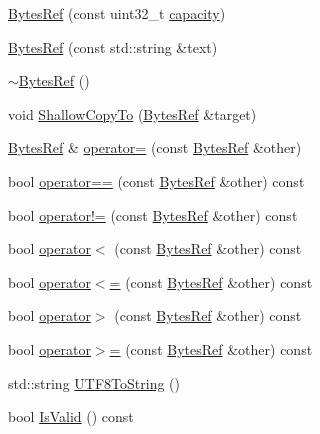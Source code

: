 \begin{DoxyCompactItemize}
\item 
\mbox{\hyperlink{classlucene_1_1core_1_1util_1_1BytesRef_add244078b49f9f132839a804f1312223}{Bytes\+Ref}} (const uint32\+\_\+t \mbox{\hyperlink{classlucene_1_1core_1_1util_1_1BytesRef_a9e1775d26ac1dec137aa57fae87f654c}{capacity}})
\item 
\mbox{\hyperlink{classlucene_1_1core_1_1util_1_1BytesRef_a27fd90759a52d4ea1fe88e5af2f7bb92}{Bytes\+Ref}} (const std\+::string \&text)
\item 
\mbox{\hyperlink{classlucene_1_1core_1_1util_1_1BytesRef_a7c9d7930ac1511839e4cd2f551e8a78a}{$\sim$\+Bytes\+Ref}} ()
\item 
void \mbox{\hyperlink{classlucene_1_1core_1_1util_1_1BytesRef_a2f75314d896984075dfd351b4d8e3e49}{Shallow\+Copy\+To}} (\mbox{\hyperlink{classlucene_1_1core_1_1util_1_1BytesRef}{Bytes\+Ref}} \&target)
\item 
\mbox{\hyperlink{classlucene_1_1core_1_1util_1_1BytesRef}{Bytes\+Ref}} \& \mbox{\hyperlink{classlucene_1_1core_1_1util_1_1BytesRef_a83163bf442814183adc151dccf70bc73}{operator=}} (const \mbox{\hyperlink{classlucene_1_1core_1_1util_1_1BytesRef}{Bytes\+Ref}} \&other)
\item 
bool \mbox{\hyperlink{classlucene_1_1core_1_1util_1_1BytesRef_a1f856405da2816cb3bf448507e296d97}{operator==}} (const \mbox{\hyperlink{classlucene_1_1core_1_1util_1_1BytesRef}{Bytes\+Ref}} \&other) const
\item 
bool \mbox{\hyperlink{classlucene_1_1core_1_1util_1_1BytesRef_a06c0da4f9479190bee2e32791531bbc9}{operator!=}} (const \mbox{\hyperlink{classlucene_1_1core_1_1util_1_1BytesRef}{Bytes\+Ref}} \&other) const
\item 
bool \mbox{\hyperlink{classlucene_1_1core_1_1util_1_1BytesRef_ae91fb3040f390277b694dbb706a04860}{operator$<$}} (const \mbox{\hyperlink{classlucene_1_1core_1_1util_1_1BytesRef}{Bytes\+Ref}} \&other) const
\item 
bool \mbox{\hyperlink{classlucene_1_1core_1_1util_1_1BytesRef_a819f7a557975f9a9145bf62c50a1fcee}{operator$<$=}} (const \mbox{\hyperlink{classlucene_1_1core_1_1util_1_1BytesRef}{Bytes\+Ref}} \&other) const
\item 
bool \mbox{\hyperlink{classlucene_1_1core_1_1util_1_1BytesRef_a4d526c1de9d527ddc8298117b94ef29d}{operator$>$}} (const \mbox{\hyperlink{classlucene_1_1core_1_1util_1_1BytesRef}{Bytes\+Ref}} \&other) const
\item 
bool \mbox{\hyperlink{classlucene_1_1core_1_1util_1_1BytesRef_a17482ef83c73168704b378a6c2e43e8f}{operator$>$=}} (const \mbox{\hyperlink{classlucene_1_1core_1_1util_1_1BytesRef}{Bytes\+Ref}} \&other) const
\item 
std\+::string \mbox{\hyperlink{classlucene_1_1core_1_1util_1_1BytesRef_ad5cf9964fc7ac5450ee4c38f18f046bb}{U\+T\+F8\+To\+String}} ()
\item 
bool \mbox{\hyperlink{classlucene_1_1core_1_1util_1_1BytesRef_aa1b9faf8ecc8285118b4cc63dd8d7d57}{Is\+Valid}} () const
\end{DoxyCompactItemize}
